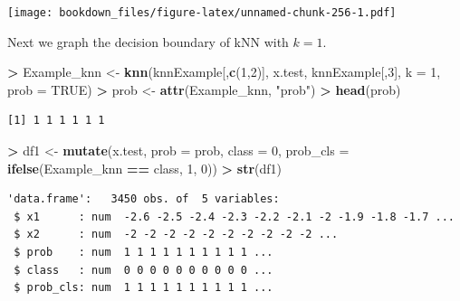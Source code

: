 \documentclass[
]{krantz}
\makeatletter
\newenvironment{Shaded}{\begin{snugshade}}{\end{snugshade}}
\newcommand{\DataTypeTok}[1]{\textcolor[rgb]{0.27,0.27,0.27}{#1}}
\newcommand{\DecValTok}[1]{\textcolor[rgb]{0.06,0.06,0.06}{#1}}
\newcommand{\KeywordTok}[1]{\textcolor[rgb]{0.27,0.27,0.27}{\textbf{#1}}}
\newcommand{\NormalTok}[1]{#1}
\newcommand{\OperatorTok}[1]{\textcolor[rgb]{0.43,0.43,0.43}{\textbf{#1}}}
\newcommand{\OtherTok}[1]{\textcolor[rgb]{0.37,0.37,0.37}{#1}}
\newcommand{\StringTok}[1]{\textcolor[rgb]{0.5,0.5,0.5}{#1}}
\newenvironment{kframe}{%
\medskip{}
\setlength{\fboxsep}{.8em}
 \def\at@end@of@kframe{}%
 \ifinner\ifhmode%
  \def\at@end@of@kframe{\end{minipage}}%
  \begin{minipage}{\columnwidth}%
 \fi\fi%
 \def\FrameCommand##1{\hskip\@totalleftmargin \hskip-\fboxsep
 \colorbox{shadecolor}{##1}\hskip-\fboxsep
     \hskip-\linewidth \hskip-\@totalleftmargin \hskip\columnwidth}%
 \MakeFramed {\advance\hsize-\width
   \@totalleftmargin\z@ \linewidth\hsize
   \@setminipage}}%
 {\par\unskip\endMakeFramed%
 \at@end@of@kframe}
\renewenvironment{Shaded}{\begin{kframe}}{\end{kframe}}
\makeatother
\begin{document}
\texttt{[image: bookdown\_files/figure-latex/unnamed-chunk-256-1.pdf]}

Next we graph the decision boundary of kNN with \(k=1\).

\begin{Shaded}
\begin{Highlighting}[]
\OperatorTok{\textgreater{}}\StringTok{ }\NormalTok{Example\_knn \textless{}{-}}\StringTok{ }\KeywordTok{knn}\NormalTok{(knnExample[,}\KeywordTok{c}\NormalTok{(}\DecValTok{1}\NormalTok{,}\DecValTok{2}\NormalTok{)], x.test, knnExample[,}\DecValTok{3}\NormalTok{], }\DataTypeTok{k =} \DecValTok{1}\NormalTok{, }\DataTypeTok{prob =} \OtherTok{TRUE}\NormalTok{)}
\OperatorTok{\textgreater{}}\StringTok{ }\NormalTok{prob \textless{}{-}}\StringTok{ }\KeywordTok{attr}\NormalTok{(Example\_knn, }\StringTok{"prob"}\NormalTok{)}
\OperatorTok{\textgreater{}}\StringTok{ }\KeywordTok{head}\NormalTok{(prob)}
\end{Highlighting}
\end{Shaded}

\begin{verbatim}
[1] 1 1 1 1 1 1
\end{verbatim}

\begin{Shaded}
\begin{Highlighting}[]
\OperatorTok{\textgreater{}}\StringTok{ }\NormalTok{df1 \textless{}{-}}\StringTok{ }\KeywordTok{mutate}\NormalTok{(x.test, }\DataTypeTok{prob =}\NormalTok{ prob, }\DataTypeTok{class =} \DecValTok{0}\NormalTok{,  }\DataTypeTok{prob\_cls =} \KeywordTok{ifelse}\NormalTok{(Example\_knn }\OperatorTok{==}\StringTok{ }\NormalTok{class, }\DecValTok{1}\NormalTok{, }\DecValTok{0}\NormalTok{))}
\OperatorTok{\textgreater{}}\StringTok{ }\KeywordTok{str}\NormalTok{(df1)}
\end{Highlighting}
\end{Shaded}

\begin{verbatim}
'data.frame':   3450 obs. of  5 variables:
 $ x1      : num  -2.6 -2.5 -2.4 -2.3 -2.2 -2.1 -2 -1.9 -1.8 -1.7 ...
 $ x2      : num  -2 -2 -2 -2 -2 -2 -2 -2 -2 -2 ...
 $ prob    : num  1 1 1 1 1 1 1 1 1 1 ...
 $ class   : num  0 0 0 0 0 0 0 0 0 0 ...
 $ prob_cls: num  1 1 1 1 1 1 1 1 1 1 ...
\end{verbatim}
\end{document}
